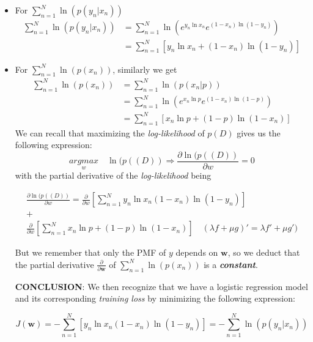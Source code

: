 \documentclass{article}
\begin{document}
\begin{itemize}
    \item For $\sum\limits_{n=1}^{N}\ln(p(y_n|x_n))$
    \[
    \begin{split}
        \sum\limits_{n=1}^{N}\ln(p(y_n|x_n)) & = \sum\limits_{n=1}^{N}\ln(e^{y_n\ln x_n}e^{(1-x_n)\ln(1-y_n)}) \\
        & = \sum\limits_{n=1}^{N}\left[ y_n\ln x_n + (1-x_n)\ln(1-y_n)\right]
    \end{split}
    \]
    \item For $\sum\limits_{n=1}^{N}\ln(p(x_n))$, similarly we get
    \[
    \begin{split}
        \sum\limits_{n=1}^{N}\ln(p(x_n)) & = \sum\limits_{n=1}^{N}\ln(p(x_n|p)) \\
        & = \sum\limits_{n=1}^{N}\ln(e^{x_n\ln p}e^{(1-x_n)\ln(1-p)}) \\
        & = \sum\limits_{n=1}^{N}\left[x_n\ln p + (1-p)\ln(1-x_n)\right]
    \end{split}
    \]
    \newline We can recall that maximizing the \textit{log-likelihood} of $p(D)$ gives us the following expression:
    \[
    \underset{w}{argmax}\quad \ln(p((D)) \Longrightarrow \frac{\partial \ln(p((D))}{\partial w} = 0
    \]
    with the partial derivative of the \textit{log-likelihood} being 
    
    \begin{multline*}
    \frac{\partial \ln(p((D))}{\partial w} = \frac{\partial}{\partial w}\left[\sum\limits_{n=1}^{N}y_n\ln x_n (1-x_n)\ln(1-y_n)\right] \\ + \\ \frac{\partial}{\partial w}\left[\sum\limits_{n=1}^{N}x_n\ln p + (1-p)\ln(1-x_n)\right] \quad (\lambda f + \mu g)'=\lambda f' + \mu g')
    \end{multline*}
    
    \newline But we remember that only the PMF of $y$ depends on $\mathbf{w}$, so we deduct that the partial derivative $\frac{\partial}{\partial \mathbf{w}}$ of $\sum\limits_{n=1}^{N}\ln(p(x_n))$ is a \textbf{\textit{constant}}.


\textbf{CONCLUSION}: We then recognize that we have a logistic regression model and its corresponding \textit{training loss} by minimizing the following expression:

\begin{equation} \label{eq4}
\boxed{
J(\mathbf{w}) = - \sum\limits_{n=1}^{N}\left[y_n\ln x_n (1-x_n)\ln(1-y_n)\right] = - \sum\limits_{n=1}^{N}\ln(p(y_n|x_n))
}
\end{equation}
 
\end{itemize}
\end{document}
